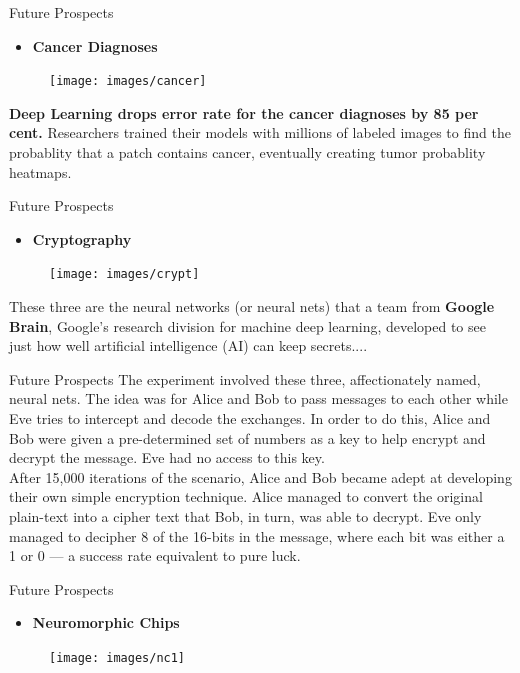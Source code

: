 \documentclass[10pt]{beamer}
\begin{document}
	\begin{frame}[c]{Future Prospects}
		\begin{itemize}
			\item \large{\textbf{Cancer Diagnoses}}
		\end{itemize}
		\begin{figure}
			\texttt{[image: images/cancer]}
		\end{figure}
		\textbf{Deep Learning drops error rate for the cancer diagnoses by 85 per cent.}
		Researchers trained their models with millions of labeled images to find the probablity that a patch contains cancer, eventually creating tumor probablity heatmaps.
	\end{frame}
	\begin{frame}[c]{Future Prospects}
		\begin{itemize}
			\item \large{\textbf{Cryptography}}
		\end{itemize}
		\begin{figure}
			\texttt{[image: images/crypt]}
		\end{figure}
		These three are the neural networks (or neural nets) that a team from \textbf{Google Brain}, Google’s research division for machine deep learning, developed to see just how well artificial intelligence (AI) can keep secrets....
	\end{frame}
	\begin{frame}[c]{Future Prospects}
		The experiment involved these three, affectionately named, neural nets. The idea was for Alice and Bob to pass messages to each other while Eve tries to intercept and decode the exchanges. In order to do this, Alice and Bob were given a pre-determined set of numbers as a key to help encrypt and decrypt the message. Eve had no access to this key.\\
		After 15,000 iterations of the scenario, Alice and Bob became adept at developing their own simple encryption technique. Alice managed to convert the original plain-text into a cipher text that Bob, in turn, was able to decrypt. Eve only managed to decipher 8 of the 16-bits in the message, where each bit was either a 1 or 0 — a success rate equivalent to pure luck.
	\end{frame}
	\begin{frame}[c]{Future Prospects}
		\begin{itemize}
			\item \large{\textbf{Neuromorphic Chips}}
		\end{itemize}
		\begin{figure}
			\texttt{[image: images/nc1]}
		\end{figure}
	\end{frame}
\end{document}
